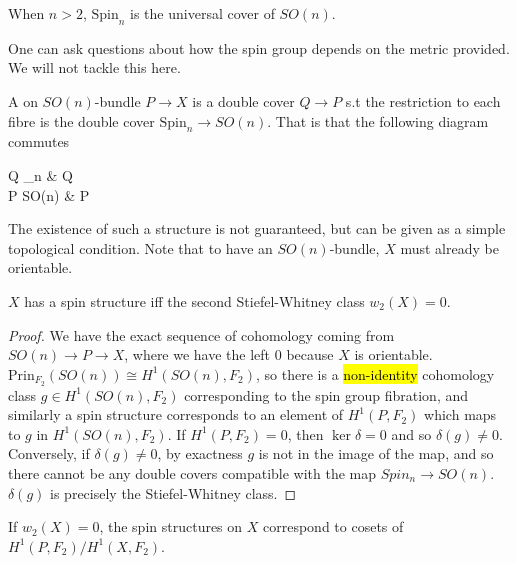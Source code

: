 \documentclass{article}
\begin{document}
\begin{prop}
	When $n>2$, $\text{Spin}_n$ is the universal cover of $SO(n)$. 
\end{prop}

\begin{remark}
	One can ask questions about how the spin group depends on the metric provided. We will not tackle this here. 
\end{remark}

\begin{definition}
	A  on $SO(n)$-bundle $P\to X$ is a double cover $Q \to P$ s.t the restriction to each fibre is the double cover $\text{Spin}_n \to SO(n)$. That is that the following diagram commutes
	\begin{tkz}
		Q \times {}_n \arrow[r] \arrow[d, twoheadrightarrow] & Q \arrow[d, twoheadrightarrow]\\
		P \times SO(n) \arrow[r] & P
	\end{tkz}
\end{definition}

The existence of such a structure is not guaranteed, but can be given as a simple topological condition. Note that to have an $SO(n)$-bundle, $X$ must already be orientable. 

\begin{prop}
	$X$ has a spin structure iff the second Stiefel-Whitney class $w_2(X)=0$. 
\end{prop}
\begin{proof}
	We have the exact sequence of cohomology
	coming from $SO(n) \to P \to X$, where we have the left 0 because $X$ is orientable. $\text{Prin}_{F_2}(SO(n)) \cong H^1(SO(n),F_2)$, so there is a \hl{non-identity} cohomology class $g \in H^1(SO(n), F_2)$ corresponding to the spin group fibration, and similarly a spin structure corresponds to an element of $H^1(P,F_2)$ which maps to $g$ in $H^1(SO(n),F_2)$. If $H^1(P,F_2)=0$, then $\ker \delta =0$ and so $\delta(g) \neq 0$. Conversely, if $\delta(g) \neq 0$, by exactness $g$ is not in the image of the map, and so there cannot be any double covers compatible with the map $Spin_n \to SO(n)$. $\delta(g)$ is precisely the Stiefel-Whitney class. 
\end{proof}
\begin{corollary}
	If $w_2(X)=0$, the spin structures on $X$ correspond to cosets of $H^1(P,F_2)/H^1(X,F_2)$. 
\end{corollary}
\end{document}
